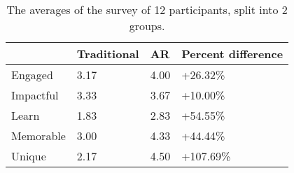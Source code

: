 \documentclass{vgtc}                          %
\begin{document}
\begin{table}[!h]
\renewcommand{\arraystretch}{1.5}
\begin{tabular}{l|l|l|l}
          & Traditional & AR   & Percent difference \\ \hline
Engaged   & 3.17        & 4.00 & +26.32\%          \\
Impactful & 3.33        & 3.67 & +10.00\%          \\
Learn     & 1.83        & 2.83 & +54.55\%          \\
Memorable & 3.00        & 4.33 & +44.44\%          \\
Unique    & 2.17        & 4.50 & +107.69\%        
\end{tabular}
\vspace*{10mm}
\caption{The averages of the survey of 12 participants, split into 2 groups.}
\label{table:surveyAverages}
\end{table}
\end{document}
